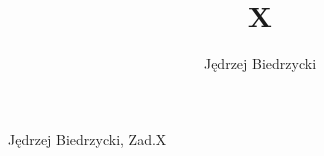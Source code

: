 \documentclass[a4paper,12pt]{article}
\author{Jędrzej Biedrzycki}
\title{X}
\begin{document}
    Jędrzej Biedrzycki, Zad.X
\end{document}
